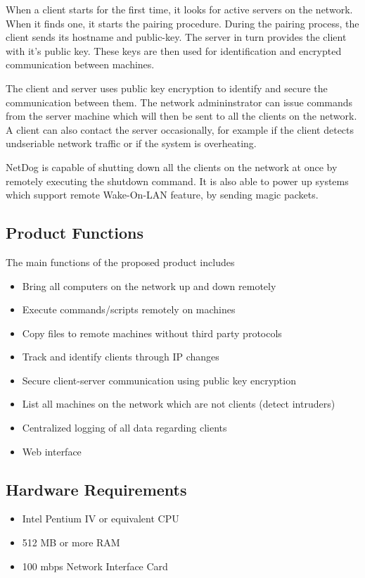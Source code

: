 When a client starts for the first time, it looks for active servers on the
network. When it finds one, it starts the pairing procedure. During the pairing
process, the client sends its hostname and public-key. The server in turn
provides the client with it's public key. These keys are then used for
identification and encrypted communication between machines.

The client and server uses public key encryption to identify and secure the
communication between them. The network admininstrator can issue commands from
the server machine which will then be sent to all the clients on the network.
A client can also contact the server occasionally, for example if the client
detects undseriable network traffic or if the system is overheating.

NetDog is capable of shutting down all the clients on the network at once by
remotely executing the shutdown command. It is also able to power up systems
which support remote Wake-On-LAN feature, by sending magic packets.

\subsection{Product Functions}
The main functions of the proposed product includes \\

\begin{itemize}
    \item Bring all computers on the network up and down remotely
    \item Execute commands/scripts remotely on machines
    \item Copy files to remote machines without third party protocols
    \item Track and identify clients through IP changes
    \item Secure client-server communication using public key encryption
    \item List all machines on the network which are not clients (detect intruders)
    \item Centralized logging of all data regarding clients
    \item Web interface
\end{itemize}

\subsection{Hardware Requirements}
\begin{itemize}
    \item Intel Pentium IV or equivalent CPU
    \item 512 MB or more RAM
    \item 100 mbps Network Interface Card
\end{itemize}


